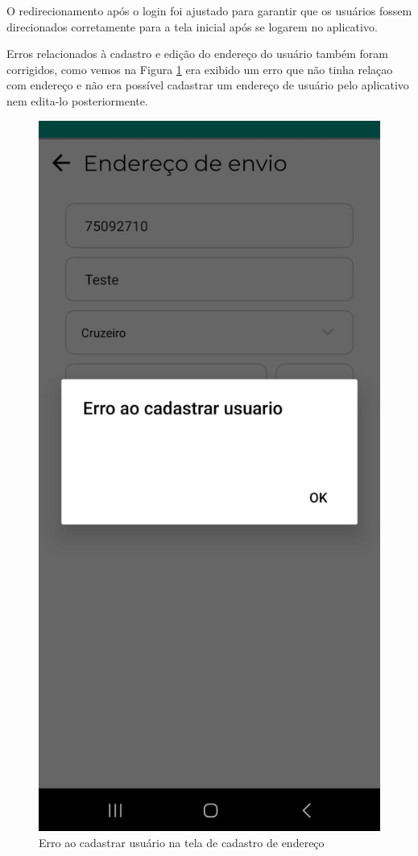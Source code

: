 O redirecionamento após o login foi ajustado para garantir que os usuários fossem direcionados corretamente para a tela inicial após se logarem no aplicativo.

Erros relacionados à cadastro e edição do endereço do usuário também foram corrigidos, como vemos na Figura \ref{enderecoerro} era exibido um erro que não tinha relaçao com endereço e não era possível cadastrar um endereço de usuário pelo aplicativo nem edita-lo posteriormente.

\begin{figure}[h]
	\centering
	\includegraphics[keepaspectratio=true,scale=0.4]{figuras/enderecoerro.png}
	\caption{Erro ao cadastrar usuário na tela de cadastro de endereço}
	\label{enderecoerro}
\end{figure}

